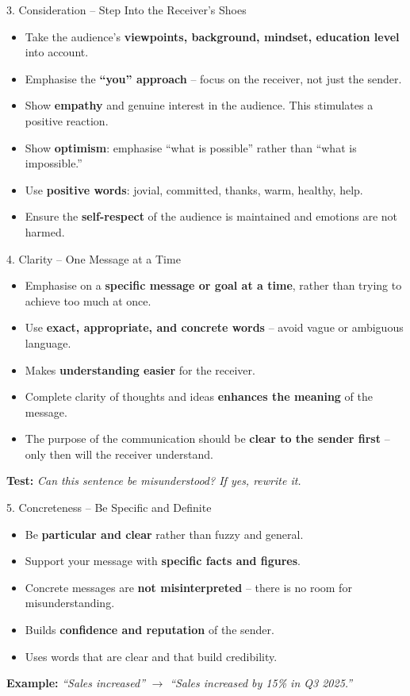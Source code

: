 \documentclass[12pt,a4paper]{article}
\begin{document}
\begin{keybox}{3. Consideration -- Step Into the Receiver's Shoes}
\begin{itemize}[noitemsep]
    \item Take the audience's \textbf{viewpoints, background, mindset, education level} into account.
    \item Emphasise the \textbf{``you'' approach} -- focus on the receiver, not just the sender.
    \item Show \textbf{empathy} and genuine interest in the audience. This stimulates a positive reaction.
    \item Show \textbf{optimism}: emphasise ``what is possible'' rather than ``what is impossible.''
    \item Use \textbf{positive words}: jovial, committed, thanks, warm, healthy, help.
    \item Ensure the \textbf{self-respect} of the audience is maintained and emotions are not harmed.
\end{itemize}
\end{keybox}

\begin{keybox}{4. Clarity -- One Message at a Time}
\begin{itemize}[noitemsep]
    \item Emphasise on a \textbf{specific message or goal at a time}, rather than trying to achieve too much at once.
    \item Use \textbf{exact, appropriate, and concrete words} -- avoid vague or ambiguous language.
    \item Makes \textbf{understanding easier} for the receiver.
    \item Complete clarity of thoughts and ideas \textbf{enhances the meaning} of the message.
    \item The purpose of the communication should be \textbf{clear to the sender first} -- only then will the receiver understand.
\end{itemize}
\textbf{Test:} \textit{Can this sentence be misunderstood? If yes, rewrite it.}
\end{keybox}

\begin{keybox}{5. Concreteness -- Be Specific and Definite}
\begin{itemize}[noitemsep]
    \item Be \textbf{particular and clear} rather than fuzzy and general.
    \item Support your message with \textbf{specific facts and figures}.
    \item Concrete messages are \textbf{not misinterpreted} -- there is no room for misunderstanding.
    \item Builds \textbf{confidence and reputation} of the sender.
    \item Uses words that are clear and that build credibility.
\end{itemize}
\textbf{Example:} \textit{``Sales increased''} $\rightarrow$ \textit{``Sales increased by 15\% in Q3 2025.''}
\end{keybox}
\end{document}
